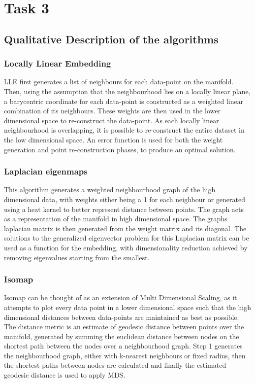 \documentclass{article}
\begin{document}
\section{Task 3}
\subsection{Qualitative Description of the algorithms}
\subsubsection{Locally Linear Embedding}
LLE first generates a list of neighbours for each data-point on the manifold. Then, using the assumption that the neighbourhood lies on a locally linear plane, a barycentric coordinate for each data-point is constructed as a weighted linear combination of its neighbours. These weights are then used in the lower dimensional space to re-construct the data-point. As each locally linear neighbourhood is overlapping, it is possible to re-construct the entire dataset in the low dimensional space. An error function is used for both the weight generation and point re-construction phases, to produce an optimal solution.
\subsubsection{Laplacian eigenmaps}
This algorithm generates a weighted neighbourhood graph of the high dimensional data, with weights either being a 1 for each neighbour or generated using a heat kernel to better represent distance between points. The graph acts as a representation of the manifold in high dimensional space. The graphs laplacian matrix is then generated from the weight matrix and its diagonal. The solutions to the generalized eigenvector problem for this Laplacian matrix can be used as a function for the embedding, with dimensionality reduction achieved by removing eigenvalues starting from the smallest.
\subsubsection{Isomap}
Isomap can be thought of as an extension of Multi Dimensional Scaling, as it attempts to plot every data point in a lower dimensional space such that the high dimensional distances between data-points are maintained as best as possible. The distance metric is an estimate of geodesic distance between points over the manifold, generated by summing the euclidean distance between nodes on the shortest path between the nodes over a neighbourhood graph. Step 1 generates the neighbourhood graph, either with k-nearest neighbours or fixed radius, then the shortest paths between nodes are calculated and finally the estimated geodesic distance is used to apply MDS.
\end{document}
